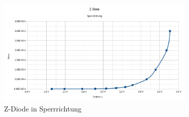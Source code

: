\begin{enumerate}[label=\alph*)]
	      \begin{figure}[h!]
		      \begin{center}
			      \includegraphics[width=0.85\textwidth]{img/4.1.a.6}
			      \caption{Z-Diode in Sperrrichtung}
		      \end{center}
	      \end{figure}


\end{enumerate}
